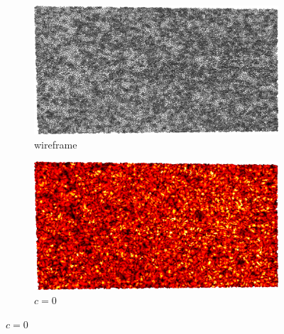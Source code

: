 \begin{figure}[ht]
	\begin{subfigure}[b]{0.49\linewidth}
		\includegraphics[width=\linewidth]
		{data/acquired_meshes/ILATO_1A_SM2066-HE5-60_070214_merged_GMO_r1_n4_v256_wireframe.png}
		\caption{wireframe}\label{ILATO:bun.a}
	\end{subfigure}
	\begin{subfigure}[b]{0.49\linewidth}
		\includegraphics[width=\linewidth]
		{data/acquired_meshes/ILATO_1A_SM2066-HE5-60_070214_merged_GMO_r1_n4_v256_funcvals_0iter.png}
		\caption{$c=0$}\label{fig:buILATOn.b}
	\end{subfigure}


\end{figure}
